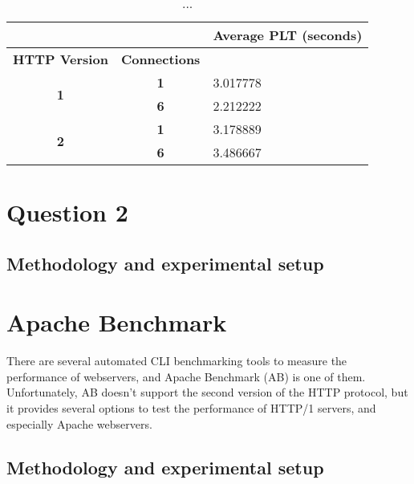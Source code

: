 \documentclass[a4paper,10pt]{article}
\begin{document}
\begin{table}[h!]
\centering
\begin{tabular}{|c|c|l|}
\hline
\multicolumn{1}{|r|}{\textbf{}} & \multicolumn{1}{l|}{} & \textbf{Average PLT (seconds)}         \\ \hline
\textbf{HTTP Version}          & \textbf{Connections}  & \multicolumn{1}{c|}{\textbf{}} \\ \hline
\multirow{2}{*}{\textbf{1}}     & \textbf{1}            & 3.017778                       \\ \cline{2-3} 
                                & \textbf{6}            & 2.212222                       \\ \hline
\multirow{2}{*}{\textbf{2}}     & \textbf{1}            & 3.178889                       \\ \cline{2-3} 
                                & \textbf{6}            & 3.486667                       \\ \hline
\end{tabular}
\caption{...}
\label{fig:table1}

\end{table}



\section{Question 2}
\subsection{Methodology and experimental setup}



\section{Apache Benchmark}

There are several automated CLI benchmarking tools to measure the performance of webservers, and Apache Benchmark (AB) is one of them. Unfortunately, AB doesn't support the second version of the HTTP protocol, but it provides several options to test the performance of HTTP/1 servers, and especially Apache webservers.

\subsection{Methodology and experimental setup}
\end{document}
